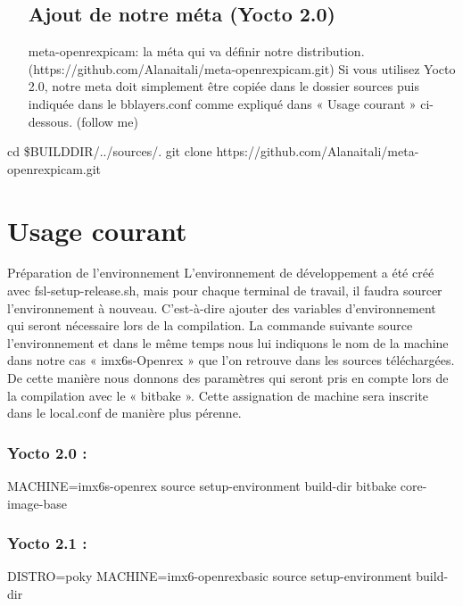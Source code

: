 \begin{itemize}
		\subsection{Ajout de notre méta (Yocto 2.0)}
		\item[meta-openrexpicam:] la méta qui va définir notre distribution.        (https://github.com/Alanaitali/meta-openrexpicam.git)
		Si vous utilisez Yocto 2.0, notre meta doit simplement être copiée dans le dossier sources puis indiquée dans le bblayers.conf comme expliqué dans « Usage courant » ci-dessous. (follow me)
	\end{itemize}

	\begin{tcolorbox}
		cd \$BUILDDIR/../sources/.
		git clone https://github.com/Alanaitali/meta-openrexpicam.git
	\end{tcolorbox}

	\section{Usage courant}
	Préparation de l’environnement
	L’environnement de développement a été créé avec fsl-setup-release.sh, mais pour chaque terminal de travail, il faudra sourcer l’environnement à nouveau. C’est-à-dire ajouter des variables d’environnement qui seront nécessaire lors de la compilation. La commande suivante source l’environnement et dans le même temps nous lui indiquons le nom de la machine dans notre cas « imx6s-Openrex » que l’on retrouve dans les sources téléchargées. De cette manière nous donnons des paramètres qui seront pris en compte lors de la compilation avec le « bitbake ». Cette assignation de machine sera inscrite dans le local.conf de manière plus pérenne.

	\subsubsection*{Yocto 2.0 :}


	\begin{tcolorbox}
		MACHINE=imx6s-openrex source setup-environment build-dir
		bitbake core-image-base
	\end{tcolorbox}

	\subsubsection*{Yocto 2.1 :}

	\begin{tcolorbox}
		DISTRO=poky MACHINE=imx6-openrexbasic source setup-environment build-dir
	\end{tcolorbox}

